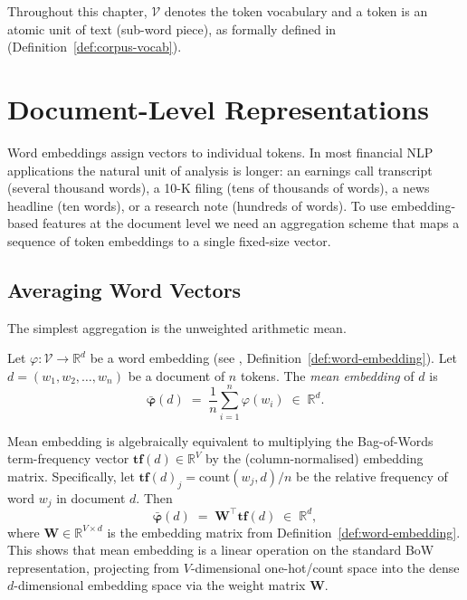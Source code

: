 \begin{remark}
\label{rem:ch2-notation}
Throughout this chapter, $\mathcal{V}$ denotes the token vocabulary and a token is an
atomic unit of text (sub-word piece), as formally defined in 
(Definition~\ref{def:corpus-vocab}).
\end{remark}

\section{Document-Level Representations}
\label{sec:doc-repr}

\begin{deepdive}

Word embeddings assign vectors to individual tokens.  In most
financial NLP applications the natural unit of analysis is longer: an
earnings call transcript (several thousand words), a 10-K filing
(tens of thousands of words), a news headline (ten words), or a
research note (hundreds of words).  To use embedding-based features
at the document level we need an aggregation scheme that maps a
sequence of token embeddings to a single fixed-size vector.

\subsection{Averaging Word Vectors}
\label{sec:doc-repr-avg}

The simplest aggregation is the unweighted arithmetic mean.

\begin{definition}
\label{def:mean-embedding}
Let $\varphi : \mathcal{V} \to \mathbb{R}^d$ be a word embedding (see , Definition~\ref{def:word-embedding}).
Let $d = (w_1, w_2, \dots, w_n)$ be a document of $n$ tokens.
The \emph{mean embedding} of $d$ is
\begin{equation}
  \bar{\boldsymbol{\varphi}}(d)
  \;=\;
  \frac{1}{n} \sum_{i=1}^{n} \varphi(w_i)
  \;\in\; \mathbb{R}^d.
  \label{eq:mean-embedding}
\end{equation}
\end{definition}

Mean embedding is algebraically equivalent to multiplying the
Bag-of-Words term-frequency vector $\mathbf{tf}(d) \in \mathbb{R}^V$
by the (column-normalised) embedding matrix.  Specifically, let
$\mathbf{tf}(d)_j = \text{count}(w_j, d)/n$ be the relative frequency
of word $w_j$ in document $d$.  Then
\begin{equation}
  \bar{\boldsymbol{\varphi}}(d)
  \;=\;
  \mathbf{W}^{\top} \mathbf{tf}(d)
  \;\in\; \mathbb{R}^d,
  \label{eq:mean-embedding-bow}
\end{equation}
where $\mathbf{W} \in \mathbb{R}^{V \times d}$ is the embedding matrix
from Definition~\ref{def:word-embedding}.  This shows that mean
embedding is a linear operation on the standard BoW representation,
projecting from $V$-dimensional one-hot/count space into the dense
$d$-dimensional embedding space via the weight matrix $\mathbf{W}$.


\end{deepdive}
